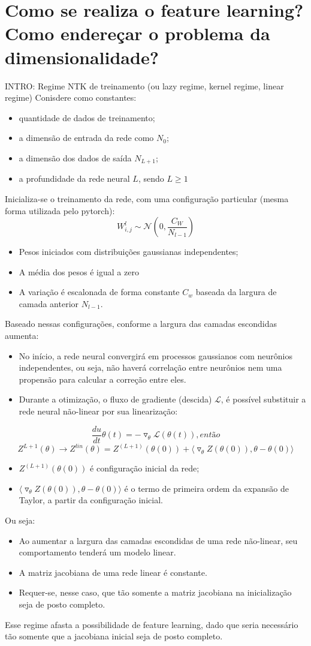 \documentclass{article}
\begin{document}
\section{Como se realiza o feature learning? Como endereçar o problema da dimensionalidade?}
INTRO: Regime NTK de treinamento (ou lazy regime, kernel regime, linear regime)
Conisdere como constantes:
\begin{itemize}
    \item quantidade de dados de treinamento;
    \item a dimensão de entrada da rede como $N_0$;
    \item a dimensão dos dados de saída $N_{L+1}$;
    \item a profundidade da rede neural $L$, sendo $L \geq 1$
\end{itemize}
Inicializa-se o treinamento da rede, com uma configuração particular (mesma forma utilizada pelo pytorch):
$$W_{i, j}^l \sim \mathcal{N}(0, \frac{C_W}{N_{l-1}})$$
\begin{itemize}
    \item Pesos iniciados com distribuições gaussianas independentes;
    \item A média dos pesos é igual a zero 
    \item A variação é escalonada de forma constante $C_w$ baseada da largura de camada anterior $N_{l-1}$.
\end{itemize}
Baseado nessas configurações, conforme a largura das camadas escondidas aumenta:
\begin{itemize}
    \item No início, a rede neural convergirá em processos gaussianos com neurônios independentes, ou seja, não haverá correlação entre neurônios nem uma propensão para calcular a correção entre eles.
    \item Durante a otimização, o fluxo de gradiente (descida) $\mathcal{L}$, é possível substituir a rede neural não-linear por sua linearização:
\end{itemize}
$$\frac{du}{dt} \theta(t) = - \triangledown_\theta \mathcal{L}(\theta(t)), então$$
$$Z^{L+1}(\theta) \rightarrow Z^{lin}(\theta) = Z^{(L+1)}(\theta(0)) + \langle \triangledown_\theta Z(\theta(0)), \theta - \theta(0) \rangle$$
\begin{itemize}
    \item $Z^{(L+1)}(\theta(0))$ é configuração inicial da rede;
    \item $\langle \triangledown_\theta Z(\theta(0)), \theta - \theta(0) \rangle$ é o termo de primeira ordem da expansão de Taylor, a partir da configuração inicial.
\end{itemize}
Ou seja:
\begin{itemize}
    \item Ao aumentar a largura das camadas escondidas de uma rede não-linear, seu comportamento tenderá um modelo linear.
    \item A matriz jacobiana de uma rede linear é constante.
    \item Requer-se, nesse caso, que tão somente a matriz jacobiana na inicialização seja de posto completo.
\end{itemize}
Esse regime afasta a possibilidade de feature learning, dado que seria necessário tão somente que a jacobiana inicial seja de posto completo.
\end{document}
